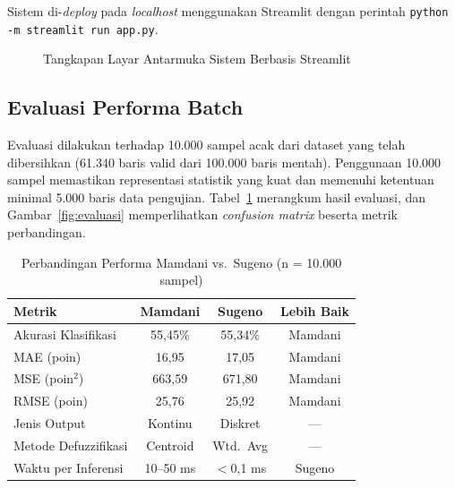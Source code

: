 \documentclass[12pt,a4paper]{report}
\begin{document}
Sistem di-\textit{deploy} pada \textit{localhost} menggunakan
Streamlit dengan perintah
\texttt{python -m streamlit run app.py}.


\begin{figure}[H]
  \centering
  \caption{Tangkapan Layar Antarmuka Sistem Berbasis Streamlit}
  \label{fig:web_gui}
\end{figure}

\subsection{Evaluasi Performa Batch}

Evaluasi dilakukan terhadap 10.000 sampel acak dari dataset yang
telah dibersihkan (61.340 baris valid dari 100.000 baris mentah).
Penggunaan 10.000 sampel memastikan representasi statistik yang
kuat dan memenuhi ketentuan minimal 5.000 baris data pengujian.
Tabel~\ref{tab:performa} merangkum hasil evaluasi, dan
Gambar~\ref{fig:evaluasi} memperlihatkan \textit{confusion
matrix} beserta metrik perbandingan.

\begin{table}[H]
  \centering
  \caption{Perbandingan Performa Mamdani vs.\ Sugeno (n = 10.000 sampel)}
  \label{tab:performa}
  \renewcommand{\arraystretch}{1.25}
  \begin{tabular}{|l|c|c|c|}
    \hline
    \textbf{Metrik} & \textbf{Mamdani} & \textbf{Sugeno} &
    \textbf{Lebih Baik} \\
    \hline
    Akurasi Klasifikasi       & 55,45\%  & 55,34\%  & Mamdani \\
    MAE (poin)                & 16,95    & 17,05    & Mamdani \\
    MSE (poin$^2$)            & 663,59   & 671,80   & Mamdani \\
    RMSE (poin)               & 25,76    & 25,92    & Mamdani \\
    Jenis Output              & Kontinu  & Diskret  & —       \\
    Metode Defuzzifikasi      & Centroid & Wtd.\ Avg & —      \\
    Waktu per Inferensi       & 10--50 ms & $<$0{,}1 ms & Sugeno \\
    \hline
  \end{tabular}
\end{table}
\end{document}
